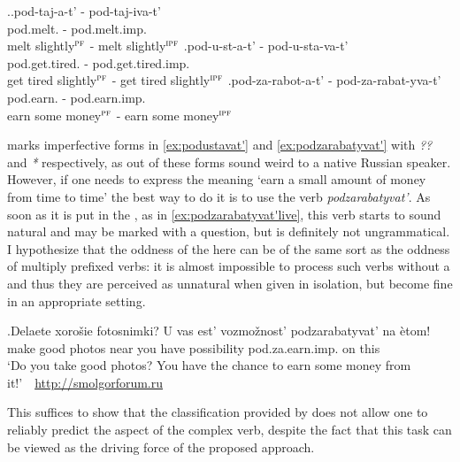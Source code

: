\ex.\label{ex:pod}\ag.pod-taj-a-t' - pod-taj-iva-t'\\
pod.melt. - pod.melt.imp.\\
melt slightly$^{\textsc{pf}}$ - melt slightly$^{\textsc{ipf}}$
\bg.\label{ex:podustavat'}pod-u-st-a-t' - pod-u-sta-va-t'\\
pod.get.tired. - pod.get.tired.imp.\\
get tired slightly$^{\textsc{pf}}$ - get tired slightly$^{\textsc{ipf}}$
\bg.\label{ex:podzarabatyvat'}pod-za-rabot-a-t' - pod-za-rabat-yva-t'\\
pod.earn. - pod.earn.imp.\\
earn some money$^{\textsc{pf}}$ - earn some money$^{\textsc{ipf}}$

\citet{Kagan:book} marks imperfective forms in \ref{ex:podustavat'} and \ref{ex:podzarabatyvat'} with \textit{??} and \textit{*} respectively, as out of  these forms sound weird to a native Russian speaker. However, if one needs to express the meaning `earn a small amount of money from time to time' the best way to do it is to use the verb \textit{podzarabatyvat'}. As soon as it is put in the , as in \ref{ex:podzarabatyvat'live}, this verb starts to sound natural and may be marked with a question, but is definitely not ungrammatical. I hypothesize that the oddness of the  here can be of the same sort as the oddness of multiply prefixed verbs: it is almost impossible to process such verbs without a  and thus they are perceived as unnatural when given in isolation, but become fine in an appropriate setting.

\exg.\label{ex:podzarabatyvat'live}Delaete xoro\v{s}ie fotosnimki? U vas est' vozmo\v{z}nost' podzarabatyvat' na \`{e}tom!\\
make good photos near you have possibility pod.za.earn.imp. on this\\
\trans `Do you take good photos? You have the chance to earn some money from it!'~~\hbox{}\hfill\hbox{\url{http://smolgorforum.ru}}

This suffices to show that the classification provided by \citet{Tatevosov:07} does not allow one to reliably predict the aspect of the complex verb, despite the fact that this task can be viewed as the driving force of the proposed approach. 

